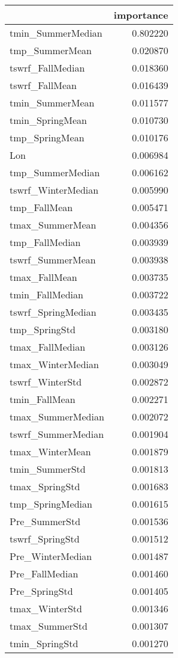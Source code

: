 \begin{tabular}{lr}
\toprule
 & importance \\
\midrule
tmin_SummerMedian & 0.802220 \\
tmp_SummerMean & 0.020870 \\
tswrf_FallMedian & 0.018360 \\
tswrf_FallMean & 0.016439 \\
tmin_SummerMean & 0.011577 \\
tmin_SpringMean & 0.010730 \\
tmp_SpringMean & 0.010176 \\
Lon & 0.006984 \\
tmp_SummerMedian & 0.006162 \\
tswrf_WinterMedian & 0.005990 \\
tmp_FallMean & 0.005471 \\
tmax_SummerMean & 0.004356 \\
tmp_FallMedian & 0.003939 \\
tswrf_SummerMean & 0.003938 \\
tmax_FallMean & 0.003735 \\
tmin_FallMedian & 0.003722 \\
tswrf_SpringMedian & 0.003435 \\
tmp_SpringStd & 0.003180 \\
tmax_FallMedian & 0.003126 \\
tmax_WinterMedian & 0.003049 \\
tswrf_WinterStd & 0.002872 \\
tmin_FallMean & 0.002271 \\
tmax_SummerMedian & 0.002072 \\
tswrf_SummerMedian & 0.001904 \\
tmax_WinterMean & 0.001879 \\
tmin_SummerStd & 0.001813 \\
tmax_SpringStd & 0.001683 \\
tmp_SpringMedian & 0.001615 \\
Pre_SummerStd & 0.001536 \\
tswrf_SpringStd & 0.001512 \\
Pre_WinterMedian & 0.001487 \\
Pre_FallMedian & 0.001460 \\
Pre_SpringStd & 0.001405 \\
tmax_WinterStd & 0.001346 \\
tmax_SummerStd & 0.001307 \\
tmin_SpringStd & 0.001270 \\

\end{tabular}

